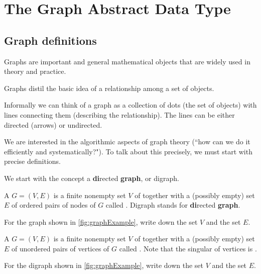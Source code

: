 \part{The Graph Abstract Data Type}
\label{ch:graphadt}


\chapter{Graph definitions}
\label{sec:graphdefs}

Graphs are important and general mathematical objects that are widely used in theory and practice. 

Graphs distil the basic idea of a relationship among a set of objects. 

Informally we can think of a graph as a collection of dots (the set of objects) with lines connecting them (describing the relationship). 
The lines can be either directed (arrows) or undirected.

We are interested in the algorithmic aspects of graph theory (``how can we do it efficiently and systematically?").  
To talk about this precisely, we must start with precise definitions.

We start with the concept a \textbf{di}rected \textbf{graph}, or digraph. 

\begin{Definition}\label{def:digraph} 
A  $G=(V,E)$ is a  finite nonempty set $V$ of  
together with a (possibly empty) set $E$ of ordered pairs of nodes of $G$ called . 
Digraph stands for \textbf{di}rected \textbf{graph}.
\end{Definition}

\begin{Boxample}[5]
For the graph shown in \cref{fig:graphExample}, write down the set $V$ and the set $E$.
\end{Boxample}

\begin{Definition}\label{def:graph}
A  $G = (V, E)$ is a finite nonempty  set $V$ of 
 together with a (possibly empty) set $E$ of unordered
pairs of vertices of $G$ called . 
Note that the singular of vertices is .
\end{Definition}

\begin{Boxample}[5]
For the digraph shown in \cref{fig:graphExample}, write down the set $V$ and the set $E$.
\end{Boxample}


